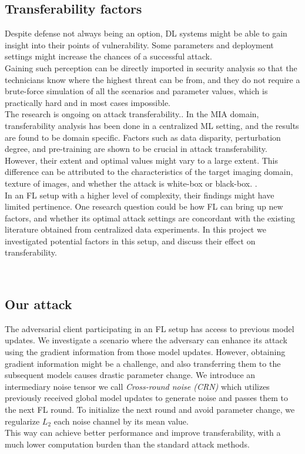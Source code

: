 \subsection{Transferability factors}
Despite defense not always being an option, DL systems might be able to gain insight into their points of vulnerability. Some parameters and deployment settings might increase the chances of a successful attack.\\
Gaining such perception can be directly imported in security analysis so that the technicians know where the highest threat can be from, and they do not require a brute-force simulation of all the scenarios and parameter values, which is practically hard and in most cases impossible. 
\\The research is ongoing on attack transferability.\cite{gao2022boosting,elaalami2022bod,dai2021fast,duan2022novel,du2020hybrid,zheng2020efficient,shafahi2019adversarial,qiu2022framework}. In the MIA domain, transferability analysis has been done in a centralized ML setting, and the results are found to be domain specific. Factors such as data disparity, perturbation degree, and pre-training are shown to be crucial in attack transferability. However, their extent and optimal values might vary to a large extent. This difference can be attributed to the characteristics of the target imaging domain, texture of images, and whether the attack is white-box or black-box.\cite{ma2021understanding} \cite{bortsova2021adversarial}. \\ In an FL setup with a higher level of complexity, their findings might have limited pertinence. \cite{costa2021covert} One research question could be how FL can bring up new factors, and whether its optimal attack settings are concordant with the existing literature obtained from centralized data experiments. 
In this project we investigated potential factors in this setup, and discuss their effect on transferability.




\\\subsection{Our attack}

The adversarial client participating in an FL setup has access to previous model updates. We investigate a scenario where the adversary can enhance its attack using the gradient information from those model updates. However, obtaining gradient information might be a challenge, and also transferring them to the subsequent models causes drastic parameter change.\cite{zheng2020efficient}
We introduce an intermediary noise tensor we call \textit{Cross-round noise (CRN)} which utilizes previously received global model updates to generate noise and passes them to the next FL round. To initialize the next round and avoid parameter change, we regularize $L_{2}$ each noise channel by its mean value. 
\\This way can achieve better performance and improve transferability, with a much lower computation burden than the standard attack methods. %

